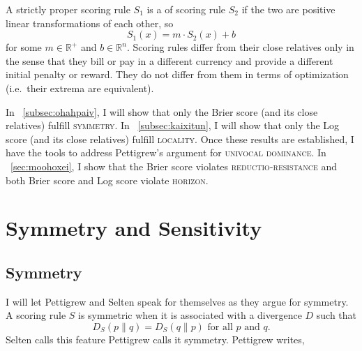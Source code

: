 \documentclass[12pt]{article}
\begin{document}

A strictly proper scoring rule $S_{1}$ is a  of
scoring rule $S_{2}$ if the two are positive linear transformations of
each other, so
\begin{equation}
  \label{eq:gaerohbi}
  S_{1}(x)=m\cdot{}S_{2}(x)+b
\end{equation}
for some $m\in\mathbb{R}^{+}$ and $b\in\mathbb{R}^{n}$.
Scoring rules differ from their close relatives only in the sense that
they bill or pay in a different currency and provide a different
initial penalty or reward. They do not differ from them in
terms of optimization (i.e.\ their extrema are equivalent). 

In {\ubsection}~\ref{subsec:ohahpaiv}, I will show that only the Brier
score (and its close relatives) fulfill \textsc{symmetry}. In
{\ubsection}~\ref{subsec:kaixitun}, I will show that only the Log
score (and its close relatives) fulfill \textsc{locality}. Once these
results are established, I have the tools to address Pettigrew's
argument for \textsc{univocal dominance}. In
{\ection}~\ref{sec:moohoxei}, I show that the Brier score violates
\textsc{reductio-resistance} and both Brier score and Log score
violate \textsc{horizon}.

\section{Symmetry and Sensitivity}
\label{sec:oolohdej}

\subsection{Symmetry}
\label{subsec:oolohdej}

I will let Pettigrew and Selten speak for themselves as they argue for
symmetry. A scoring rule $S$ is symmetric when it is associated with a
divergence $D$ such that
\begin{equation}
  \label{eq:ohsheife}
  D_{S}(p\|q)=D_{S}(q\|p)\mbox{ for all }p\mbox{ and }q.
\end{equation}
Selten calls this feature  Pettigrew calls it
symmetry. Pettigrew writes,
\end{document}
